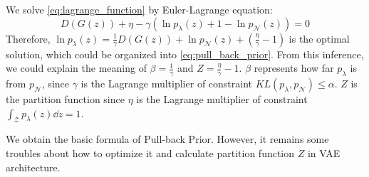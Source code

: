 We solve \cref{eq:lagrange_function} by Euler-Lagrange equation:
\begin{equation*}\label{eq:euler_lagrange_eqaution}
	D(G(z)) + \eta - \gamma (\ln p_\lambda(z) + 1 - \ln p_\mathcal{N}(z)) = 0 \tag{8}
\end{equation*}
Therefore, $\ln p_\lambda(z) = \frac{1}{\gamma} D(G(z)) + \ln p_\mathcal{N}(z) + (\frac{\eta}{\gamma} - 1)$ is the optimal solution, which could be organized into \cref{eq:pull_back_prior}. From this inference, we could explain the meaning of $\beta = \frac{1}{\gamma}$ and $Z = \frac{\eta}{\gamma} - 1$. $\beta$ represents how far $p_\lambda$ is from $p_\mathcal{N}$, since $\gamma$ is the Lagrange multiplier of constraint $KL(p_\lambda, p_\mathcal{N}) \leq \alpha$. $Z$ is the partition function since $\eta$ is the Lagrange multiplier of constraint $\int_{\mathcal{Z}} p_\lambda(z) \dd z = 1$.

We obtain the basic formula of Pull-back Prior. However, it remains some troubles about how to optimize it and calculate partition function $Z$ in VAE architecture. 



